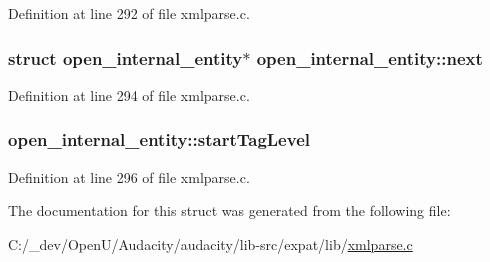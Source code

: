 Definition at line 292 of file xmlparse.\+c.

\subsubsection[{\texorpdfstring{next}{next}}]{\setlength{\rightskip}{0pt plus 5cm}struct {\bf open\+\_\+internal\+\_\+entity}$\ast$ open\+\_\+internal\+\_\+entity\+::next}\hypertarget{structopen__internal__entity_a0b4f673ac931c37b732241224bcdaceb}{}\label{structopen__internal__entity_a0b4f673ac931c37b732241224bcdaceb}


Definition at line 294 of file xmlparse.\+c.

\subsubsection[{\texorpdfstring{start\+Tag\+Level}{startTagLevel}}]{ open\+\_\+internal\+\_\+entity\+::start\+Tag\+Level}\hypertarget{structopen__internal__entity_a0ea9487efef54876450978d24ecf49d6}{}\label{structopen__internal__entity_a0ea9487efef54876450978d24ecf49d6}


Definition at line 296 of file xmlparse.\+c.



The documentation for this struct was generated from the following file\+:\begin{DoxyCompactItemize}
\item 
C\+:/\+\_\+dev/\+Open\+U/\+Audacity/audacity/lib-\/src/expat/lib/\hyperlink{xmlparse_8c}{xmlparse.\+c}\end{DoxyCompactItemize}
